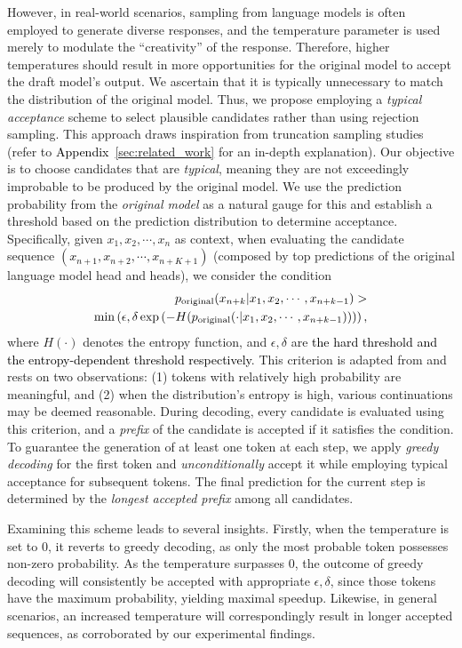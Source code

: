 However, in real-world scenarios, sampling from language models is often employed to generate diverse responses, and the temperature parameter is used merely to modulate the ``creativity'' of the response. Therefore, higher temperatures should result in more opportunities for the original model to accept the draft model's output. We ascertain that it is typically unnecessary to match the distribution of the original model. Thus, we propose employing a \emph{typical acceptance} scheme to select plausible candidates rather than using rejection sampling. This approach draws inspiration from truncation sampling studies~\citep{hewitt2022truncation} (refer to \textcolor{black}{Appendix}~\ref{sec:related_work} for an in-depth explanation). Our objective is to choose candidates that are \emph{typical}, meaning they are not exceedingly improbable to be produced by the original model. We use the prediction probability from the \emph{original model} as a natural gauge for this and establish a threshold based on the prediction distribution to determine acceptance. Specifically, given $x_1, x_2, \cdots, x_n$ as context, when evaluating the candidate sequence \textcolor{black}{$(x_{n+1}, x_{n+2}, \cdots, x_{n+K+1})$ }(composed by top predictions of the original language model head and \ours heads), we consider the condition
\begin{align*}
p_{\text{original}}(x_{n+k}|x_1, x_2, \cdots, x_{n+k-1}) > \\\min\left(\epsilon, \delta\exp\left(-H(p_{\text{original}}(\cdot|x_1, x_2, \cdots, x_{n+k-1}))\right)\right),
\end{align*}
where $H(\cdot)$ denotes the entropy function, and $\epsilon, \delta$ are \textcolor{black}{the hard threshold and the entropy-dependent
threshold respectively}. This criterion is adapted from \citet{hewitt2022truncation} and rests on two observations: (1) tokens with relatively high probability are meaningful, and (2) when the distribution's entropy is high, various continuations may be deemed reasonable. During decoding, every candidate is evaluated using this criterion, and a \emph{prefix} of the candidate is accepted if it satisfies the condition. To guarantee the generation of at least one token at each step, we apply \emph{greedy decoding} for the first token and \emph{unconditionally} accept it while employing typical acceptance for subsequent tokens. The final prediction for the current step is determined by the \emph{longest accepted prefix} among all candidates.

Examining this scheme leads to several insights. Firstly, when the temperature is set to $0$, it reverts to greedy decoding, as only the most probable token possesses non-zero probability. As the temperature surpasses $0$, the outcome of greedy decoding will consistently be accepted with appropriate $\epsilon, \delta$, since those tokens have the maximum probability, yielding maximal speedup. Likewise, in general scenarios, an increased temperature will correspondingly result in longer accepted sequences, as corroborated by our experimental findings.

